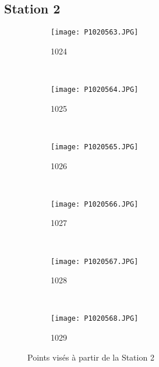 \subsection{Station 2}
\begin{figure}[!h]
    \centering
    \begin{subfigure}[b]{0.3\textwidth}
        \texttt{[image: P1020563.JPG]}
        \caption{1024}%
        \label{P1020563}
    \end{subfigure}
    ~
    \begin{subfigure}[b]{0.3\textwidth}
        \texttt{[image: P1020564.JPG]}
        \caption{1025}%
        \label{P1020564}
    \end{subfigure}
    ~
    \begin{subfigure}[b]{0.3\textwidth}
        \texttt{[image: P1020565.JPG]}
        \caption{1026}%
        \label{P1020565}
    \end{subfigure}
    \\
    \begin{subfigure}[b]{0.3\textwidth}
        \texttt{[image: P1020566.JPG]}
        \caption{1027}%
        \label{P1020566}
    \end{subfigure}
    ~
    \begin{subfigure}[b]{0.3\textwidth}
        \texttt{[image: P1020567.JPG]}
        \caption{1028}%
        \label{P1020567}
    \end{subfigure}
    ~
    \begin{subfigure}[b]{0.3\textwidth}
        \texttt{[image: P1020568.JPG]}
        \caption{1029}%
        \label{P1020568}
    \end{subfigure}
    \caption{Points visés à partir de la Station 2}
    \label{Points Cibles S2a}
\end{figure}
